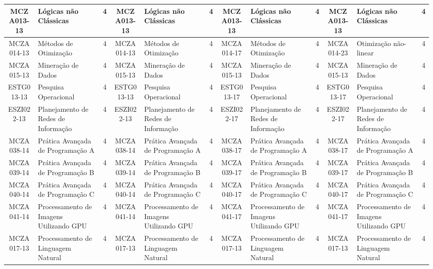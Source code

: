 \documentclass[a4paper]{article}
\begin{document}
\begin{landscape}
{\begin{longtable}{|c|p{.2\textheight}|c||c|p{.2\textheight}|c||c|p{.2\textheight}|c||c|p{.2\textheight}|c|}
MCZA013-13 & Lógicas não Clássicas & 4 &
MCZA013-13 & Lógicas não Clássicas & 4 &
MCZA013-13 & Lógicas não Clássicas & 4 &
MCZA013-13 & Lógicas não Clássicas & 4\\ \hline

MCZA014-13 & Métodos de Otimização & 4 &
MCZA014-13 & Métodos de Otimização & 4 &
MCZA014-17 & Métodos de Otimização & 4 &
MCZA014-23 & Otimização não-linear & 4\\ \hline

MCZA015-13 & Mineração de Dados & 4 &
MCZA015-13 & Mineração de Dados & 4 &
MCZA015-13 & Mineração de Dados & 4 &
MCZA015-13 & Mineração de Dados & 4\\ \hline

ESTG013-13 & Pesquisa Operacional & 4 &
ESTG013-13 & Pesquisa Operacional & 4 &
ESTG013-17 & Pesquisa Operacional & 4 &
ESTG013-17 & Pesquisa Operacional & 4\\ \hline

ESZI022-13 & Planejamento de Redes de Informação & 4 &
ESZI022-13 & Planejamento de Redes de Informação & 4 &
ESZI022-17 & Planejamento de Redes de Informação & 4 &
ESZI022-17 & Planejamento de Redes de Informação & 4\\ \hline

MCZA038-14 & Prática Avançada de Programação A & 4 &
MCZA038-14 & Prática Avançada de Programação A & 4 &
MCZA038-17 & Prática Avançada de Programação A & 4 &
MCZA038-17 & Prática Avançada de Programação A & 4\\ \hline

MCZA039-14 & Prática Avançada de Programação B & 4 &
MCZA039-14 & Prática Avançada de Programação B & 4 &
MCZA039-17 & Prática Avançada de Programação B & 4 & 
MCZA039-17 & Prática Avançada de Programação B & 4\\ \hline

MCZA040-14 & Prática Avançada de Programação C & 4 &
MCZA040-14 & Prática Avançada de Programação C & 4 &
MCZA040-17 & Prática Avançada de Programação C & 4 &
MCZA040-17 & Prática Avançada de Programação C & 4\\ \hline

MCZA041-14 & Processamento de Imagens Utilizando GPU & 4 &
MCZA041-14 & Processamento de Imagens Utilizando GPU & 4 &
MCZA041-17 & Processamento de Imagens Utilizando GPU & 4 & 
MCZA041-17 & Processamento de Imagens Utilizando GPU & 4\\ \hline

MCZA017-13 & Processamento de Linguagem Natural & 4 &
MCZA017-13 & Processamento de Linguagem Natural & 4 &
MCZA017-13 & Processamento de Linguagem Natural & 4 &
MCZA017-13 & Processamento de Linguagem Natural & 4\\ \hline


\end{longtable}}
\end{landscape}
\end{document}
